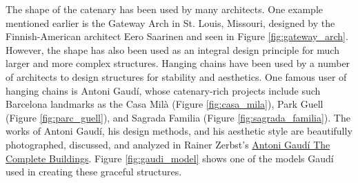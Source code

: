 \documentclass{thesis}
\begin{document}
The shape of the catenary has been used by many architects.  One example mentioned earlier is the Gateway Arch in St. Louis, Missouri, designed by
the Finnish-American architect Eero Saarinen and seen in Figure \ref{fig:gateway_arch}.  However, the shape has also been used as an integral design
principle for much larger and more complex structures.  Hanging chains have been used by a number of architects to design structures for stability and
aesthetics.  One famous user of hanging chains is Antoni Gaud\'{i}, whose catenary-rich projects include such Barcelona landmarks as the Casa Mil\`{a}
(Figure \ref{fig:casa_mila}), Park Guell (Figure \ref{fig:parc_guell}), and Sagrada Familia (Figure \ref{fig:sagrada_familia}).  The works of Antoni
Gaud\'{i}, his design methods, and his aesthetic style are beautifully photographed, discussed, and analyzed in Rainer Zerbst's
\underline{Antoni Gaud\'{i} The Complete Buildings}\cite{zerbst85gaudi}.  Figure \ref{fig:gaudi_model} shows one of the models Gaud\'{i} used in
creating these graceful structures.
\end{document}
